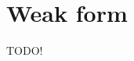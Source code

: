 \documentclass[
12pt,
a4paper,
onecolumn,
portrait
]{article}
\begin{document}
\section{Weak form}
TODO!

\newpage
\renewcommand{\refname}{Reference} %

\nocite{tritton2012physical}




\end{document}
